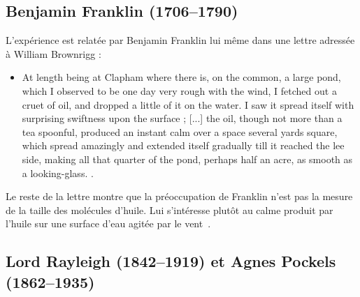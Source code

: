 \documentclass[12pt,a4paper]{article}
\begin{document}
\subsection{Benjamin Franklin (1706--1790)}

L'expérience est relatée par Benjamin Franklin lui même dans une lettre adressée à William Brownrigg\cite{Franklin1773a} :
\begin{itemize}
\item[]
\og
At length being at Clapham where there is, on the common, a large pond, which I observed to be one day very rough with the wind, I fetched out a cruet of oil, and dropped a little of it on the water.
I saw it spread itself with surprising swiftness upon the surface ;
[...] the oil, though not more than a tea spoonful, produced an instant calm over a space several yards square, which spread amazingly and extended itself gradually till it reached the lee side, making all that quarter of the pond, perhaps half an acre, as smooth as a looking-glass.
\fg{}.
\end{itemize}
Le reste de la lettre montre que la préoccupation de Franklin n'est pas la mesure de la taille des molécules d'huile.
Lui s'intéresse plutôt au calme produit par l'huile sur une surface d'eau agitée par le vent~\cite{Mertens2006}.

\subsection{Lord Rayleigh (1842--1919) et Agnes Pockels (1862--1935)}
\end{document}
